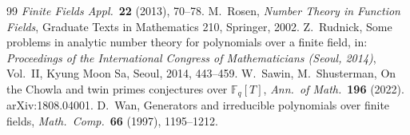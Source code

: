 \documentclass[11pt,a4paper]{article}
\theoremstyle{definition}
\theoremstyle{remark}
\begin{document}
\begin{thebibliography}{99}
 \textit{Finite Fields Appl.}\ \textbf{22} (2013), 70--78.
 M.~Rosen, \textit{Number Theory in Function Fields}, Graduate Texts in Mathematics 210,
 Springer, 2002.
 Z.~Rudnick, Some problems in analytic number theory for polynomials over a finite
 field, in: \textit{Proceedings of the International Congress of Mathematicians (Seoul, 2014)}, Vol.~II,
 Kyung Moon Sa, Seoul, 2014, 443--459.
 W.~Sawin, M.~Shusterman, On the Chowla and twin primes conjectures over
 $\mathbb F_q[T]$, \textit{Ann.\ of Math.}\ \textbf{196} (2022). arXiv:1808.04001.
 D.~Wan, Generators and irreducible polynomials over finite fields,
 \textit{Math.\ Comp.}\ \textbf{66} (1997), 1195--1212.
\end{thebibliography}
\end{document}
